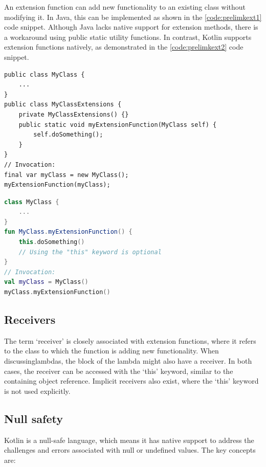 An extension function can add new functionality to an existing class without modifying it\cite{KExt}. In Java, this can be implemented as shown in the \ref{code:prelimkext1} code snippet. Although Java lacks native support for extension methods, there is a workaround using public static utility functions. In contrast, Kotlin supports extension functions natively, as demonstrated in the \ref{code:prelimkext2} code snippet.

\begin{lstlisting}[caption={Extension functions in Java},language=Java11,label=code:prelimkext1]
public class MyClass {
    ...
}
public class MyClassExtensions {
    private MyClassExtensions() {}
    public static void myExtensionFunction(MyClass self) {
        self.doSomething();
    }
}
// Invocation:
final var myClass = new MyClass();
myExtensionFunction(myClass);
\end{lstlisting}

\begin{lstlisting}[caption={Extension functions in Kotlin},language=Kotlin,label=code:prelimkext2]
class MyClass {
    ...
}
fun MyClass.myExtensionFunction() {
    this.doSomething()
    // Using the "this" keyword is optional
}
// Invocation:
val myClass = MyClass()
myClass.myExtensionFunction()
\end{lstlisting}

\subsection{Receivers}

The term `receiver' is closely associated with extension functions, where it refers to the class to which the function is adding new functionality. When discussinglambdas, the block of the lambda might also have a receiver. In both cases, the receiver can be accessed with the `this' keyword, similar to the containing object reference. Implicit receivers also exist, where the `this' keyword is not used explicitly.

\subsection{Null safety}

Kotlin is a null-safe language, which means it has native support to address the challenges and errors associated with null or undefined values. The key concepts are:

